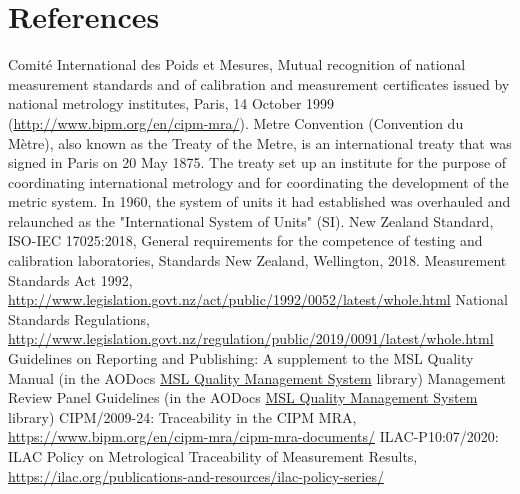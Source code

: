 \section{References}

\begingroup
\renewcommand{\section}[2]{}%

\begin{thebibliography}{9}
 Comit\'e International des Poids et Mesures, Mutual recognition of national measurement standards and of calibration and measurement certificates issued by national metrology institutes, Paris, 14 October 1999 (\url{http://www.bipm.org/en/cipm-mra/}).
 Metre Convention (Convention du M\`etre), also known as the Treaty of the Metre, is an international treaty that was signed in Paris on 20 May 1875. The treaty set up an institute for the purpose of coordinating international metrology and for coordinating the development of the metric system. In 1960, the system of units it had established was overhauled and relaunched as the "International System of Units" (SI).
 New Zealand Standard, ISO-IEC 17025:2018, General requirements for the competence of testing and calibration laboratories, Standards New Zealand, Wellington, 2018.
 {Measurement Standards Act 1992}, \url{http://www.legislation.govt.nz/act/public/1992/0052/latest/whole.html}
 {National Standards Regulations}, \url{http://www.legislation.govt.nz/regulation/public/2019/0091/latest/whole.html}
 Guidelines on Reporting and Publishing: A supplement to the MSL Quality Manual (in the AODocs \href{https://aodocs.altirnao.com/?locale=en_NZ&aodocs-domain=callaghaninnovation.govt.nz#Menu_listDoc/LibraryId_SkJpYFA1uuD6N1jOV1/ViewId_SkJpcBbvZJa1IRko5Y/ViewParams_%257B%2522searchInSubFolders%2522:false,%2522userFilters%2522:%255B%257B%2522property%2522:%2522folder%2522,%2522operator%2522:%2522EQUAL%2522,%2522values%2522:%255B%25221r8UkK6gfEQ0VWsPOd9wLbWm0oamnYQok%2522%255D%257D%255D%257D}{MSL Quality Management System} library)
 Management Review Panel Guidelines (in the AODocs \href{https://aodocs.altirnao.com/?locale=en_NZ&aodocs-domain=callaghaninnovation.govt.nz#Menu_listDoc/LibraryId_SkJpYFA1uuD6N1jOV1/ViewId_SkJpcBbvZJa1IRko5Y/ViewParams_%257B%2522searchInSubFolders%2522:false,%2522userFilters%2522:%255B%257B%2522property%2522:%2522folder%2522,%2522operator%2522:%2522EQUAL%2522,%2522values%2522:%255B%25221r8UkK6gfEQ0VWsPOd9wLbWm0oamnYQok%2522%255D%257D%255D%257D}{MSL Quality Management System} library)\bibitem{CIPM_MRA_POLICY} {CIPM/2009-24: Traceability in the CIPM MRA}, \url{https://www.bipm.org/en/cipm-mra/cipm-mra-documents/}
 {ILAC-P10:07/2020: ILAC Policy on Metrological Traceability of Measurement Results}, \url{https://ilac.org/publications-and-resources/ilac-policy-series/}
\end{thebibliography}

\endgroup